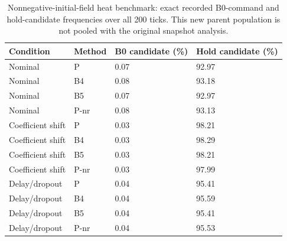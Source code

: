 \begin{table}[ht]
\caption{Nonnegative-initial-field heat benchmark: exact recorded B0-command and hold-candidate frequencies over all 200 ticks. This new parent population is not pooled with the original snapshot analysis.}\label{tab:choices_new_heat}
\centering\small
\begin{tabular}{@{}llll@{}}\toprule
Condition & Method & B0 candidate (\%) & Hold candidate (\%)\\\midrule
Nominal & P & 0.07 & 92.97 \\
Nominal & B4 & 0.08 & 93.18 \\
Nominal & B5 & 0.07 & 92.97 \\
Nominal & P-nr & 0.08 & 93.13 \\
Coefficient shift & P & 0.03 & 98.21 \\
Coefficient shift & B4 & 0.03 & 98.29 \\
Coefficient shift & B5 & 0.03 & 98.21 \\
Coefficient shift & P-nr & 0.03 & 97.99 \\
Delay/dropout & P & 0.04 & 95.41 \\
Delay/dropout & B4 & 0.04 & 95.59 \\
Delay/dropout & B5 & 0.04 & 95.41 \\
Delay/dropout & P-nr & 0.04 & 95.53 \\
\bottomrule\end{tabular}
\end{table}
